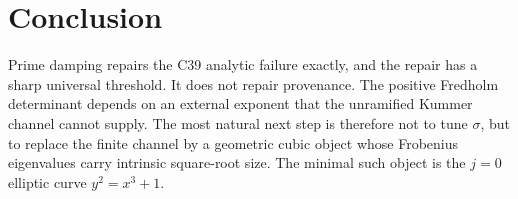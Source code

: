 \documentclass[11pt]{article}
\theoremstyle{remark}\newtheorem{remark}[theorem]{Remark}
\begin{document}
\section{Conclusion}
Prime damping repairs the C39 analytic failure exactly, and the repair has a
sharp universal threshold.  It does not repair provenance.  The positive
Fredholm determinant depends on an external exponent that the unramified
Kummer channel cannot supply.  The most natural next step is therefore not
to tune \(\sigma\), but to replace the finite channel by a geometric cubic
object whose Frobenius eigenvalues carry intrinsic square-root size.  The
minimal such object is the \(j=0\) elliptic curve
\(y^2=x^3+1\).


\end{document}
